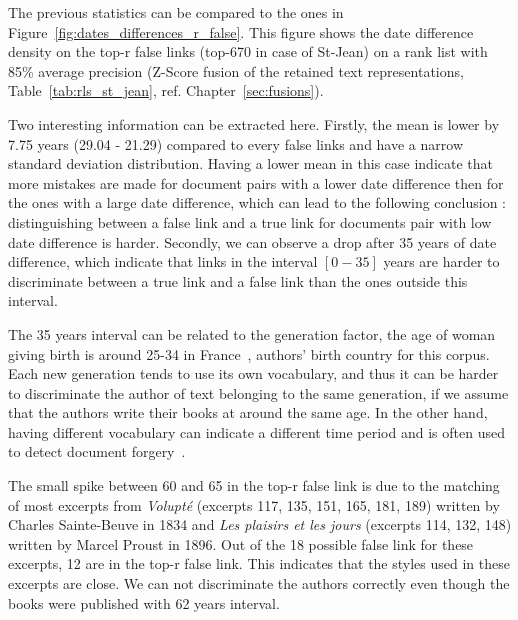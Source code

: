 The previous statistics can be compared to the ones in Figure~\ref{fig:dates_differences_r_false}.
This figure shows the date difference density on the top-r false links (top-670 in case of St-Jean) on a rank list with 85\% average precision (Z-Score fusion of the retained text representations, Table~\ref{tab:rls_st_jean}, ref. Chapter~\ref{sec:fusions}).

Two interesting information can be extracted here.
Firstly, the mean is lower by 7.75 years (29.04 - 21.29) compared to every false links and have a narrow standard deviation distribution.
Having a lower mean in this case indicate that more mistakes are made for document pairs with a lower date difference then for the ones with a large date difference, which can lead to the following conclusion : distinguishing between a false link and a true link for documents pair with low date difference is harder.
Secondly, we can observe a drop after 35 years of date difference, which indicate that links in the interval $\left[0-35\right]$ years are harder to discriminate between a true link and a false link than the ones outside this interval.

The 35 years interval can be related to the generation factor, the age of woman giving birth is around 25-34 in France~\cite{generations}, authors' birth country for this corpus.
Each new generation tends to use its own vocabulary, and thus it can be harder to discriminate the author of text belonging to the same generation, if we assume that the authors write their books at around the same age.
In the other hand, having different vocabulary can indicate a different time period and is often used to detect document forgery~\cite{savoy_stylo}.

The small spike between 60 and 65 in the top-r false link is due to the matching of most excerpts from \textit{Volupté} (excerpts 117, 135, 151, 165, 181, 189) written by Charles Sainte-Beuve in 1834 and \textit{Les plaisirs et les jours} (excerpts 114, 132, 148) written by Marcel Proust in 1896.
Out of the 18 possible false link for these excerpts, 12 are in the top-r false link.
This indicates that the styles used in these excerpts are close.
We can not discriminate the authors correctly even though the books were published with 62 years interval.

